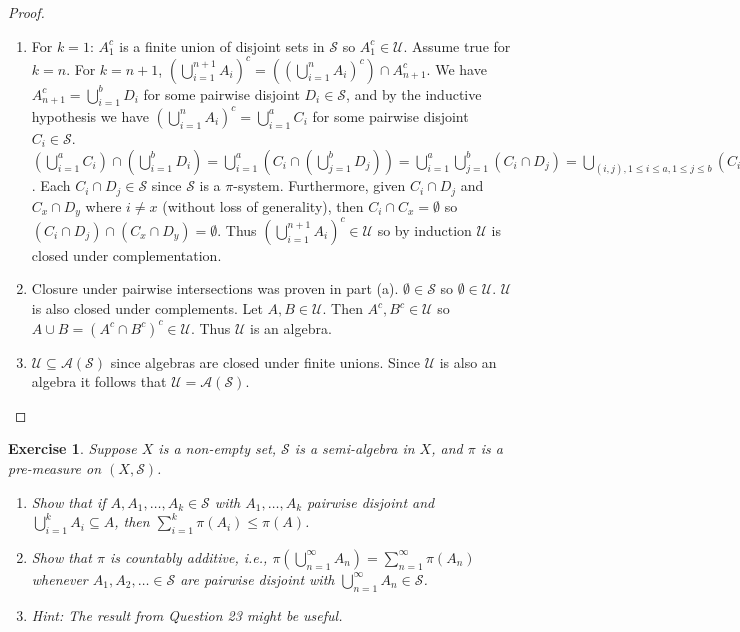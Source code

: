 \documentclass{article}
\newtheorem{exercise}[theorem]{Exercise}
\begin{document}
\begin{proof}
\begin{enumerate}
    \item[(a)] For $k=1$: $A_1^c$ is a finite union of disjoint sets in $\mathcal{S}$ so $A_1^c\in\mathcal{U}$. Assume true for $k=n$. For $k=n+1$, $(\bigcup_{i=1}^{n+1}A_i)^c=((\bigcup_{i=1}^{n}A_i)^c)\cap A_{n+1}^c$. We have $A_{n+1}^c=\bigcup_{i=1}^b D_i$ for some pairwise disjoint $D_i\in\mathcal{S}$, and by the inductive hypothesis we have $(\bigcup_{i=1}^{n}A_i)^c=\bigcup_{i=1}^a C_i$ for some pairwise disjoint $C_i\in\mathcal{S}$. $(\bigcup_{i=1}^a C_i)\cap(\bigcup_{i=1}^b D_i)=\bigcup_{i=1}^a(C_i\cap(\bigcup_{j=1}^b D_j))=\bigcup_{i=1}^a\bigcup_{j=1}^b(C_i\cap D_j)=\bigcup_{(i,j),1\leq i\leq a,1\leq j\leq b}(C_i\cap D_j)$. Each $C_i\cap D_j\in\mathcal{S}$ since $\mathcal{S}$ is a $\pi$-system. Furthermore, given $C_i\cap D_j$ and $C_x\cap D_y$ where $i\neq x$ (without loss of generality), then $C_i\cap C_x=\emptyset$ so $(C_i\cap D_j)\cap(C_x\cap D_y)=\emptyset$. Thus $(\bigcup_{i=1}^{n+1}A_i)^c\in\mathcal{U}$ so by induction $\mathcal{U}$ is closed under complementation.
    \item[(b)] Closure under pairwise intersections was proven in part (a). $\emptyset\in\mathcal{S}$ so $\emptyset\in\mathcal{U}$. $\mathcal{U}$ is also closed under complements. Let $A,B\in\mathcal{U}$. Then $A^c,B^c\in\mathcal{U}$ so $A\cup B=(A^c\cap B^c)^c\in\mathcal{U}$. Thus $\mathcal{U}$ is an algebra.
    \item[(c)] $\mathcal{U}\subseteq\mathcal{A}(\mathcal{S})$ since algebras are closed under finite unions. Since $\mathcal{U}$ is also an algebra it follows that $\mathcal{U}=\mathcal{A}(\mathcal{S})$.
\end{enumerate}
\end{proof}
\begin{exercise}
    Suppose $X$ is a non-empty set, $\mathcal{S}$ is a semi-algebra in $X$, and $\pi$ is a pre-measure on $(X, \mathcal{S})$.
    \begin{enumerate}
        \item[(a)] Show that if $A, A_1, \dots, A_k \in \mathcal{S}$ with $A_1, \dots, A_k$ pairwise disjoint and $\bigcup_{i=1}^k A_i \subseteq A$, then $\sum_{i=1}^k \pi(A_i) \leq \pi(A)$.
        \item[(b)] Show that $\pi$ is countably additive, i.e., $\pi(\bigcup_{n=1}^\infty A_n) = \sum_{n=1}^\infty \pi(A_n)$ whenever $A_1, A_2, \dots \in \mathcal{S}$ are pairwise disjoint with $\bigcup_{n=1}^\infty A_n \in \mathcal{S}$.
        \item[] \textit{Hint: The result from Question 23 might be useful.}
    \end{enumerate}
\end{exercise}
\end{document}

